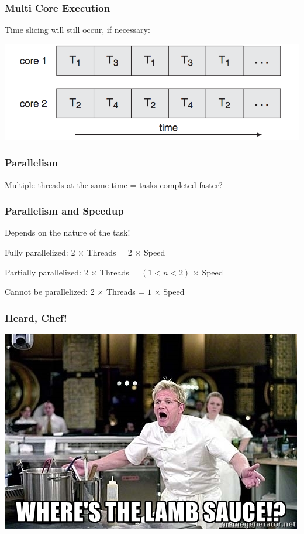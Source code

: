 \begin{frame}
	\frametitle{Multi Core Execution}

	Time slicing will still occur, if necessary:

	\begin{center}
		\includegraphics[width=\textwidth]{images/dual-core-execution.png}
	\end{center}


\end{frame}



\begin{frame}
	\frametitle{Parallelism}

	Multiple threads at the same time = tasks completed faster?

\end{frame}

\begin{frame}
	\frametitle{Parallelism and Speedup}

	Depends on the nature of the task!

	Fully parallelized: 2 $\times$ Threads = 2 $\times$ Speed

	Partially parallelized: 2 $\times$ Threads = $(1 < n < 2)$ $\times$ Speed

	Cannot be parallelized: 2 $\times$ Threads = $1$ $\times$ Speed

\end{frame}


\begin{frame}
	\frametitle{Heard, Chef!}

	\begin{center}
		\includegraphics[width=\textwidth]{images/lamb-sauce.jpg}
	\end{center}

\end{frame}



